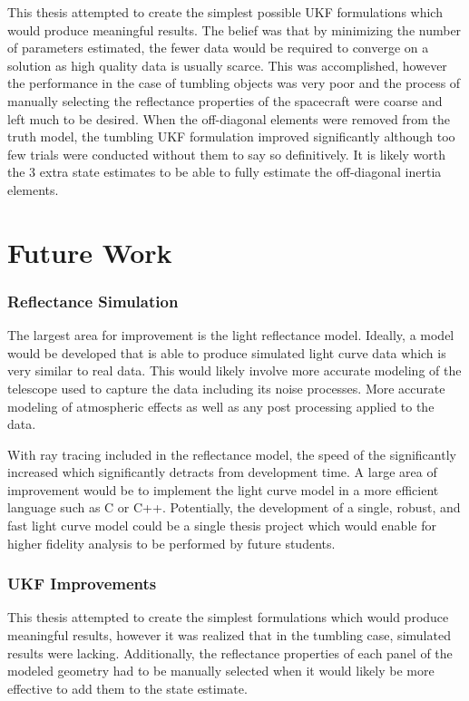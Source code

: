 This thesis attempted to create the simplest possible UKF formulations which would produce meaningful results. The belief was that by minimizing the number of parameters estimated, the fewer data would be required to converge on a solution as high quality data is usually scarce. This was accomplished, however the performance in the case of tumbling objects was very poor and the process of manually selecting the reflectance properties of the spacecraft were coarse and left much to be desired. When the off-diagonal elements were removed from the truth model, the tumbling UKF formulation improved significantly although too few trials were conducted without them to say so definitively. It is likely worth the 3 extra state estimates to be able to fully estimate the off-diagonal inertia elements.


\chapter{Future Work}

\subsection{Reflectance Simulation}
The largest area for improvement is the light reflectance model. Ideally, a model would be developed that is able to produce simulated light curve data which is very similar to real data. This would likely involve more accurate modeling of the telescope used to capture the data including its noise processes. More accurate modeling of atmospheric effects as well as any post processing applied to the data. 

With ray tracing included in the reflectance model, the speed of the significantly increased which significantly detracts from development time. A large area of improvement would be to implement the light curve model in a more efficient language such as C or C++. Potentially, the development of a single, robust, and fast light curve model could be a single thesis project which would enable for higher fidelity analysis to be performed by future students.

\subsection{UKF Improvements}

This thesis attempted to create the simplest formulations which would produce meaningful results, however it was realized that in the tumbling case, simulated results were lacking. Additionally, the reflectance properties of each panel of the modeled geometry had to be manually selected when it would likely be more effective to add them to the state estimate. 

